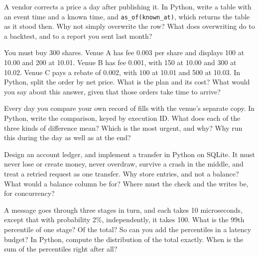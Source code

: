 \begin{question}\label{iq:iv3:system-design:20}
A vendor corrects a price a day after publishing it. In Python, write a table with an event time and a known time, and \texttt{as\_of(known\_at)}, which returns the table as it stood then. Why not simply overwrite the row? What does overwriting do to a backtest, and to a report you sent last month?
\end{question}

\begin{question}\label{iq:iv3:system-design:21}
You must buy 300 shares. Venue A has fee 0.003 per share and displays 100 at 10.00 and 200 at 10.01. Venue B has fee 0.001, with 150 at 10.00 and 300 at 10.02. Venue C pays a rebate of 0.002, with 100 at 10.01 and 500 at 10.03. In Python, split the order by net price. What is the plan and its cost? What would you say about this answer, given that those orders take time to arrive?
\end{question}

\begin{question}\label{iq:iv3:system-design:22}
Every day you compare your own record of fills with the venue's separate copy. In Python, write the comparison, keyed by execution ID. What does each of the three kinds of difference mean? Which is the most urgent, and why? Why run this during the day as well as at the end?
\end{question}

\begin{question}\label{iq:iv3:system-design:23}
Design an account ledger, and implement a transfer in Python on SQLite. It must never lose or create money, never overdraw, survive a crash in the middle, and treat a retried request as one transfer. Why store entries, and not a balance? What would a balance column be for? Where must the check and the writes be, for concurrency?
\end{question}

\begin{question}\label{iq:iv3:system-design:24}
A message goes through three stages in turn, and each takes 10 microseconds, except that with probability 2\%, independently, it takes 100. What is the 99th percentile of one stage? Of the total? So can you add the percentiles in a latency budget? In Python, compute the distribution of the total exactly. When is the sum of the percentiles right after all?
\end{question}

